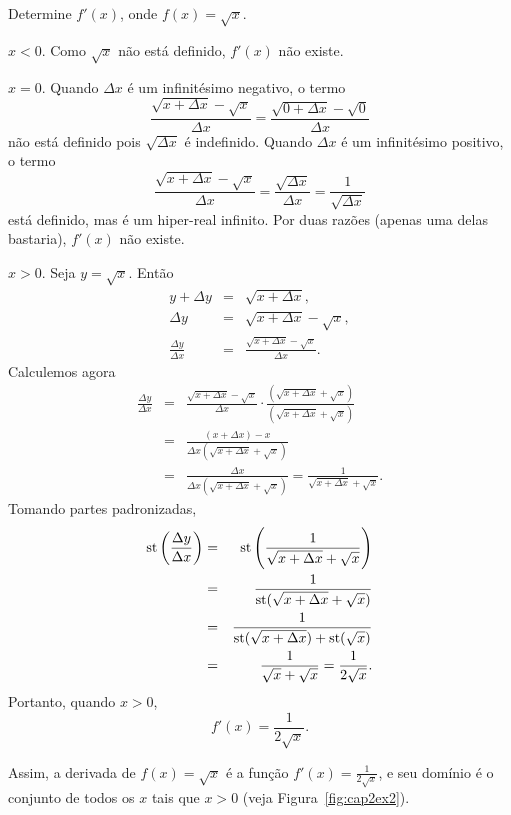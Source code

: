 \begin{example}
Determine $f'(x)$, onde $f(x) = \sqrt{x}$.
\begin{caseanalysis}
\item $x < 0$. Como $\sqrt{x}$ não está definido, $f'(x)$ não existe.
\item $x = 0$. Quando $\Delta{x}$ é um infinitésimo negativo, o termo
      $$
        \frac{\sqrt{x+\Delta{x}}-\sqrt{x}}{\Delta{x}} =
          \frac{\sqrt{0+\Delta{x}}-\sqrt{0}}{\Delta{x}}
      $$
      não está definido pois $\sqrt{\Delta{x}}$ é indefinido. Quando
      $\Delta{x}$ é um infinitésimo positivo, o termo
      $$
        \frac{\sqrt{x+\Delta{x}}-\sqrt{x}}{\Delta{x}} =
          \frac{\sqrt{\Delta{x}}}{\Delta{x}} =
            \frac{1}{\sqrt{\Delta{x}}}
      $$
      está definido, mas é um hiper-real infinito. Por duas razões
      (apenas uma delas bastaria), $f'(x)$ não existe.
\item $x>0$. Seja $y=\sqrt{x}$. Então
      \begin{eqnarray*}
        y+\Delta{y}                 & = & \sqrt{x + \Delta{x}}, \\
        \Delta{y}                   & = & \sqrt{x + \Delta{x}} - \sqrt{x}, \\
        \frac{\Delta{y}}{\Delta{x}} & = &
          \frac{\sqrt{x + \Delta{x}} - \sqrt{x}}{\Delta{x}}.
      \end{eqnarray*}
      Calculemos agora
      \begin{eqnarray*}
        \frac{\Delta{y}}{\Delta{x}} & = &
          \frac{\sqrt{x + \Delta{x}} - \sqrt{x}}{\Delta{x}} \cdot
          \frac{(\sqrt{x + \Delta{x}} + \sqrt{x})}
               {(\sqrt{x + \Delta{x}} + \sqrt{x})} \\
        & = &
          \frac{(x+\Delta{x})-x}{\Delta{x}(\sqrt{x + \Delta{x}} + \sqrt{x})} \\
        & = &
          \frac{\Delta{x}}{\Delta{x}(\sqrt{x + \Delta{x}} + \sqrt{x})} =
          \frac{1}{\sqrt{x + \Delta{x}} + \sqrt{x}}.
      \end{eqnarray*}
      Tomando partes padronizadas,
      \begin{eqnarray*}
        \operatorname{st}\left(\frac{\Delta{y}}{\Delta{x}}\right) & = &
          \operatorname{st}\left(\frac{1}{\sqrt{x + \Delta{x}} + \sqrt{x}}\right) \\
        & = &
          \frac{1}{\operatorname{st}(\sqrt{x + \Delta{x}} + \sqrt{x})} \\
        & = &
          \frac{1}{\operatorname{st}(\sqrt{x + \Delta{x}}) + \operatorname{st}(\sqrt{x})} \\
        & = &
          \frac{1}{\sqrt{x} + \sqrt{x}} = \frac{1}{2\sqrt{x}}.
      \end{eqnarray*}
      Portanto, quando $x > 0$,
      $$
        f'(x) = \frac{1}{2\sqrt{x}}.
      $$
\end{caseanalysis}
Assim, a derivada de $f(x) = \sqrt{x}$ é a função
$f'(x) = \frac{1}{2\sqrt{x}}$, e seu domínio é o conjunto de todos os
$x$ tais que $x > 0$ (veja Figura~\ref{fig:cap2ex2}).
\end{example}

